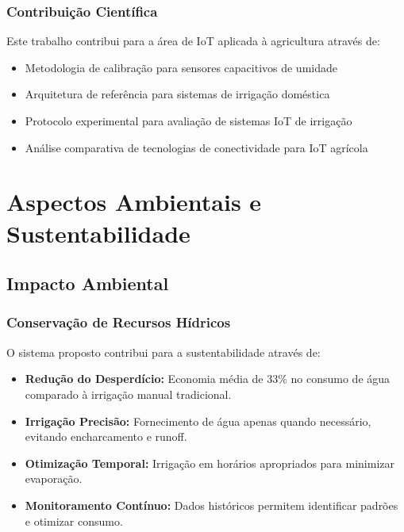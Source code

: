 \subsection{Contribuição Científica}
Este trabalho contribui para a área de IoT aplicada à agricultura através de:
\begin{itemize}
    \item Metodologia de calibração para sensores capacitivos de umidade
    \item Arquitetura de referência para sistemas de irrigação doméstica
    \item Protocolo experimental para avaliação de sistemas IoT de irrigação
    \item Análise comparativa de tecnologias de conectividade para IoT agrícola
\end{itemize}

\chapter{Aspectos Ambientais e Sustentabilidade}

\section{Impacto Ambiental}

\subsection{Conservação de Recursos Hídricos}
O sistema proposto contribui para a sustentabilidade através de:
\begin{itemize}
    \item \textbf{Redução do Desperdício:} Economia média de 33\% no consumo de água comparado à irrigação manual tradicional.
    \item \textbf{Irrigação Precisão:} Fornecimento de água apenas quando necessário, evitando encharcamento e runoff.
    \item \textbf{Otimização Temporal:} Irrigação em horários apropriados para minimizar evaporação.
    \item \textbf{Monitoramento Contínuo:} Dados históricos permitem identificar padrões e otimizar consumo.
\end{itemize}

